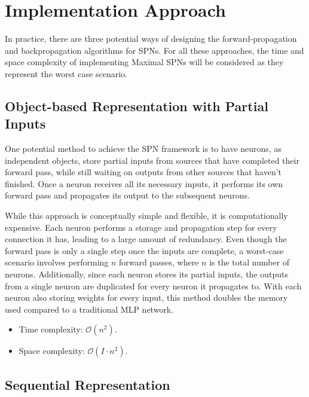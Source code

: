 \section{Implementation Approach}

In practice, there are three potential ways of designing the forward-propagation and backpropagation algorithms for SPNs. For all these approaches, the time and space complexity of implementing Maximal SPNs will be considered as they represent the worst case scenario.

\subsection{Object-based Representation with Partial Inputs}

One potential method to achieve the SPN framework is to have neurons, as independent objects, store partial inputs from sources that have completed their forward pass, while still waiting on outputs from other sources that haven't finished. Once a neuron receives all its necessary inputs, it performs its own forward pass and propagates its output to the subsequent neurons.
 
While this approach is conceptually simple and flexible, it is computationally expensive. Each neuron performs a storage and propagation step for every connection it has, leading to a large amount of redundancy. Even though the forward pass is only a single step once the inputs are complete, a worst-case scenario involves performing $n$ forward passes, where $n$ is the total number of neurons. Additionally, since each neuron stores its partial inputs, the outputs from a single neuron are duplicated for every neuron it propagates to. With each neuron also storing weights for every input, this method doubles the memory used compared to a traditional MLP network.

\begin{itemize}
    \item Time complexity: $\mathcal{O}(n^2)$.
    \item Space complexity: $\mathcal{O}(I \cdot n^2)$.
\end{itemize}


\subsection{Sequential Representation}

